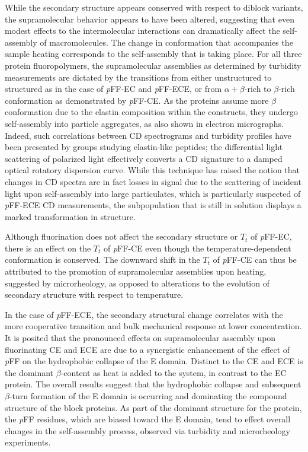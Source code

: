 \begin{refsection}
While the secondary structure appears conserved with respect to diblock
variants, the supramolecular behavior appears to have been altered, suggesting
that even modest effects to the intermolecular interactions can dramatically
affect the self-assembly of macromolecules.\cite{URRY1974} The change in
conformation that accompanies the sample heating corresponds to the
self-assembly that is taking place. For all three protein fluoropolymers, the
supramolecular assemblies as determined by turbidity measurements are dictated
by the transitions from either unstructured to structured as in the case of
\emph{p}FF-EC and \emph{p}FF-ECE, or from ${\alpha+\beta}$-rich to ${\beta}$-rich conformation
as demonstrated by \emph{p}FF-CE. As the proteins assume more ${\beta}$ conformation
due to the elastin composition within the constructs, they undergo self-assembly
into particle aggregates, as also shown in electron micrographs. Indeed, such correlations between CD spectrograms and
turbidity profiles have been presented by groups studying elastin-like
peptides; the differential light scattering of polarized light effectively
converts a CD signature to a damped optical rotatory dispersion curve. While
this technique has raised the notion that changes in CD spectra are in fact
losses in signal due to the scattering of incident light upon self-assembly into
large particulates, which is particularly suspected of \emph{p}FF-ECE CD
measurements, the subpopulation that is still in solution displays a marked
transformation in structure.

Although fluorination does not affect the secondary structure or ${T_t}$ of
\emph{p}FF-EC, there is an effect on the ${T_t}$ of \emph{p}FF-CE even though the
temperature-dependent conformation is conserved. The downward shift in the
${T_t}$ of \emph{p}FF-CE can thus be attributed to the promotion of supramolecular
assemblies upon heating, suggested by microrheology, as opposed to alterations
to the evolution of secondary structure with respect to temperature.

In the case of \emph{p}FF-ECE, the secondary structural change correlates with the more
cooperative transition and bulk mechanical response at lower concentration. It
is posited that the pronounced effects on supramolecular assembly upon
fluorinating CE and ECE are due to a synergistic enhancement of the effect of
\emph{p}FF on the hydrophobic collapse of the E domain. Distinct to the CE and ECE is
the dominant ${\beta}$-content as heat is added to the system, in contrast to
the EC protein. The overall results suggest that the hydrophobic collapse and
subsequent ${\beta}$-turn formation of the E domain is occurring and dominating
the compound structure of the block proteins. As part of the dominant structure
for the protein, the \emph{p}FF residues, which are biased toward the E domain, tend to
effect overall changes in the self-assembly process, observed via turbidity and
microrheology experiments.


\end{refsection}
